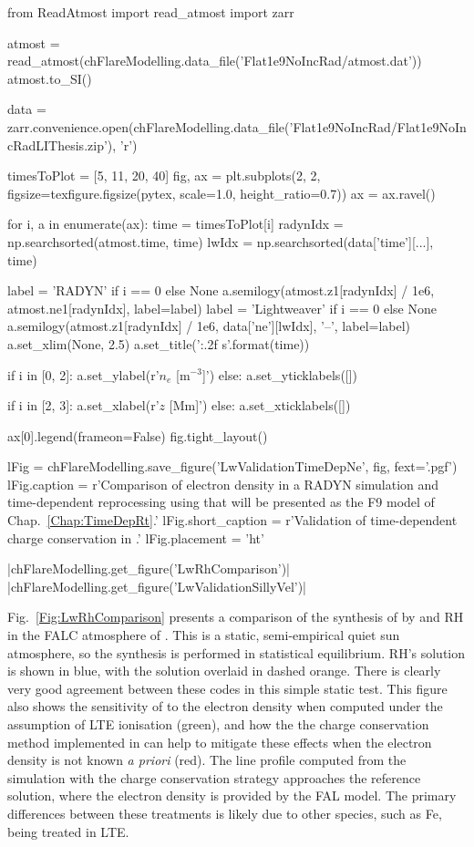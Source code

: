 \begin{pycode}[FlareModelling]
from ReadAtmost import read_atmost
import zarr

atmost = read_atmost(chFlareModelling.data_file('Flat1e9NoIncRad/atmost.dat'))
atmost.to_SI()

data = zarr.convenience.open(chFlareModelling.data_file('Flat1e9NoIncRad/Flat1e9NoIncRadLIThesis.zip'), 'r')

timesToPlot = [5, 11, 20, 40]
fig, ax = plt.subplots(2, 2, figsize=texfigure.figsize(pytex, scale=1.0, height_ratio=0.7))
ax = ax.ravel()

for i, a in enumerate(ax):
    time = timesToPlot[i]
    radynIdx = np.searchsorted(atmost.time, time)
    lwIdx = np.searchsorted(data['time'][...], time)

    label = 'RADYN' if i == 0 else None
    a.semilogy(atmost.z1[radynIdx] / 1e6, atmost.ne1[radynIdx], label=label)
    label = 'Lightweaver' if i == 0 else None
    a.semilogy(atmost.z1[radynIdx] / 1e6, data['ne'][lwIdx], '--', label=label)
    a.set_xlim(None, 2.5)
    a.set_title('{:.2f} s'.format(time))

    if i in [0, 2]:
        a.set_ylabel(r'$n_e$ [m$^{-3}$]')
    else:
        a.set_yticklabels([])

    if i in [2, 3]:
        a.set_xlabel(r'$z$ [Mm]')
    else:
        a.set_xticklabels([])

ax[0].legend(frameon=False)
fig.tight_layout()

lFig = chFlareModelling.save_figure('LwValidationTimeDepNe', fig, fext='.pgf')
lFig.caption = r'Comparison of electron density in a RADYN simulation and time-dependent reprocessing using \Lw{} that will be presented as the F9 model of Chap.~\ref{Chap:TimeDepRt}.'
lFig.short_caption = r'Validation of time-dependent charge conservation in \Lw{}.'
lFig.placement = 'ht'
\end{pycode}

\py[FlareModelling]|chFlareModelling.get_figure('LwRhComparison')|
\py[FlareModelling]|chFlareModelling.get_figure('LwValidationSillyVel')|


Fig.~\ref{Fig:LwRhComparison} presents a comparison of the synthesis of \CaLine{} by \Lw{} and RH in the FALC atmosphere of \citet{Fontenla1993}.
This is a static, semi-empirical quiet sun atmosphere, so the synthesis is performed in statistical equilibrium.
RH's solution is shown in blue, with the \Lw{} solution overlaid in dashed orange.
There is clearly very good agreement between these codes in this simple static test.
This figure also shows the sensitivity of \CaLine{} to the electron density when computed under the assumption of LTE ionisation (green), and how the the charge conservation method implemented in \Lw{} can help to mitigate these effects when the electron density is not known \emph{a priori} (red).
The line profile computed from the simulation with the charge conservation strategy approaches the reference solution, where the electron density is provided by the FAL model.
The primary differences between these treatments is likely due to other species, such as Fe, being treated in LTE.


